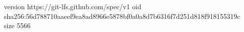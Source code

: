 version https://git-lfs.github.com/spec/v1
oid sha256:56d788710aaeef9ea8ad8966e5878bf0a0a8d7b6316f7d251d818f918155319c
size 5566
